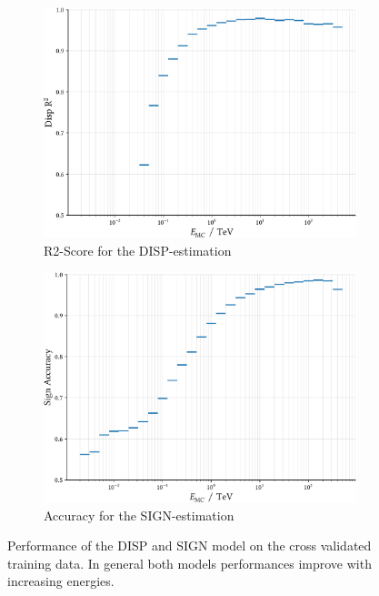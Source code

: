 \begin{figure}
    \centering
    \captionsetup{width=0.9\linewidth}
    \begin{subfigure}{0.45\textwidth}
        \includegraphics[width=\linewidth]{../analysis/plots/disp_gamma_r2_equal_sized.pdf} 
        \caption{R2-Score for the DISP-estimation}
    \end{subfigure}
    \begin{subfigure}{0.45\textwidth}
        \includegraphics[width=\linewidth]{../analysis/plots/disp_gamma_acc_equal_sized.pdf}
        \caption{Accuracy for the SIGN-estimation}
    \end{subfigure}
    \caption{Performance of the DISP and SIGN model on the cross validated training
    data. In general both models performances improve with increasing energies.}
    \label{fig:disp_perf}
\end{figure}

